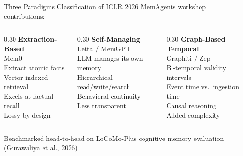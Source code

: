 \documentclass[aspectratio=169]{beamer}
\begin{document}
\begin{frame}{Three Paradigms}
  Classification of ICLR 2026 MemAgents workshop contributions:

  \vspace{0.3cm}

  \begin{columns}[T]
    \begin{column}{0.30\textwidth}
      \centering
      \textbf{\textcolor{pRed}{Extraction-Based}}\\[0.2cm]
      {\small Mem0\\[0.15cm]
      Extract atomic facts\\
      Vector-indexed retrieval\\[0.15cm]
      \alert{Excels at factual recall}\\
      Lossy by design}
    \end{column}

    \begin{column}{0.30\textwidth}
      \centering
      \textbf{\textcolor{pRed}{Self-Managing}}\\[0.2cm]
      {\small Letta / MemGPT\\[0.15cm]
      LLM manages its own memory\\
      Hierarchical read/write/search\\[0.15cm]
      \alert{Behavioral continuity}\\
      Less transparent}
    \end{column}

    \begin{column}{0.30\textwidth}
      \centering
      \textbf{\textcolor{pRed}{Graph-Based Temporal}}\\[0.2cm]
      {\small Graphiti / Zep\\[0.15cm]
      Bi-temporal validity intervals\\
      Event time vs.\ ingestion time\\[0.15cm]
      \alert{Causal reasoning}\\
      Added complexity}
    \end{column}
  \end{columns}

  \vspace{0.4cm}

  {\footnotesize Benchmarked head-to-head on LoCoMo-Plus cognitive memory evaluation (Gurawaliya et al., 2026)}
\end{frame}
\end{document}

